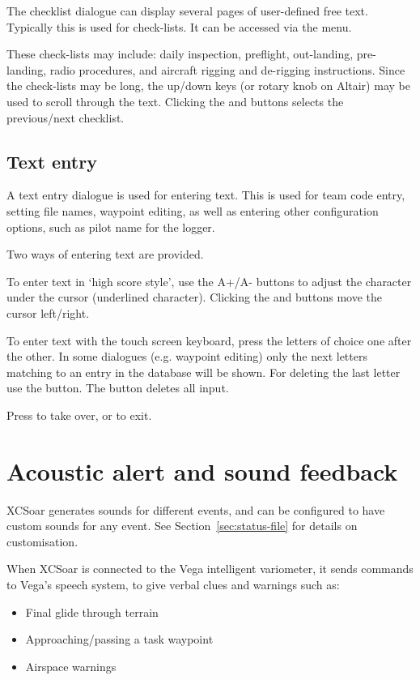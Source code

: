 The checklist dialogue can display several pages of user-defined free text.
Typically this is used for check-lists. It can be accessed via the menu.

\blink{}

These check-lists may include: daily inspection, preflight, out-landing,
pre-landing, radio procedures, and aircraft rigging and de-rigging
instructions.  Since the check-lists may be long, the up/down keys (or rotary
knob on Altair) may be used to scroll through the text. Clicking the
\bmenuw{$<$} and \bmenuw{$>$} buttons selects the previous/next checklist.


\subsection*{Text entry} \label{sec:textentry}

A text entry dialogue is used for entering text.  This is used for team
code entry, setting file names, waypoint editing, as well as entering
other configuration options, such as pilot name for the logger.

Two ways of entering text are provided.

To enter text in `high score style', use the A+/A- buttons to adjust the
character under the cursor (underlined character). Clicking the \button{$<$}
and \button{$>$} buttons move the cursor left/right.

To enter text with the touch screen keyboard, press the letters of choice
one after the other. In some dialogues (e.g. waypoint editing) only the next
letters matching to an entry in the database will be shown. For deleting the
last letter use the \button{$<-$} button. The  button deletes all input.

Press  to take over, or  to exit.


\section{Acoustic alert and sound feedback}

XCSoar generates sounds for different events, and can be configured to
have custom sounds for any event.  See Section~\ref{sec:status-file} for
details on customisation.

When XCSoar is connected to the Vega intelligent variometer, it sends
commands to Vega's speech system, to give verbal clues and warnings such as:
\begin{itemize}
\item Final glide through terrain
\item Approaching/passing a task waypoint
\item Airspace warnings
\end{itemize}

